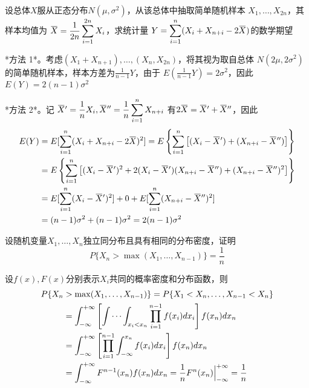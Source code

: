 \documentclass{article}
\begin{document}
\begin{examplle}[]
设总体\(X\)服从正态分布\(N(\mu,\sigma^2)\)，从该总体中抽取简单随机样本
\(X_1,\dots,X_{2n}\)，其样本均值为
\(\displaystyle\bbar{X}=\frac{1}{2n}\sum_{i=1}^{2n}X_i\)，求统计量
\(Y=\displaystyle\sum_{i=1}^n(X_i+X_{n+i}-2\bbar{X})\)的数学期望

*方法 1*。考虑\((X_1+X_{n+1}),\dots,(X_n,X_{2n})\)，将其视为取自总体
\(N(2\mu,2\sigma^2)\)的简单随机样本，样本方差为\(\frac{1}{n-1}Y\)，由于
\(E(\frac{1}{n-1}Y)=2\sigma^2\)，因此\(E(Y)=2(n-1)\sigma^2\)

*方法 2*。记
\(\bbar{X}'=\displaystyle\frac{1}{n}X_i,\bbar{X}''=\frac{1}{n}\sum_{i=1}^nX_{n+i}\)
有\(2\bbar{X} =\bbar{X}'+\bbar{X}''\)，因此
\begin{align*}
E(Y)&=E[\sum_{i=1}^n(X_i+X_{n+i}-2\bbar{X})^2]=
E\left\{\sum_{i=1}^n\left[(X_i-\bbar{X}')+(X_{n+i}-\bbar{X}'')\right]\right\}\\
&=E\left\{\sum_{i=1}^n\left[(X_i-\bbar{X}')^2+2(X_i-\bbar{X}')(X_{n+i}-\bbar{X}'')+
(X_{n+i}-\bbar{X}'')^2\right]\right\}\\
&=E[\sum_{i=1}^n(X_i-\bbar{X}')^2]+0+E[\sum_{i=1}^n(X_{n+i}-\bbar{X}'')^2]\\
&=(n-1)\sigma^2+(n-1)\sigma^2=2(n-1)\sigma^2
\end{align*}
\end{examplle}

\begin{examplle}[]
设随机变量\(X_1,\dots,X_n\)独立同分布且具有相同的分布密度，证明
\begin{equation*}
P\{X_n>\max(X_1,\dots,X_{n-1})\}=\frac{1}{n}
\end{equation*}

设\(f(x),F(x)\)分别表示\(X_i\)共同的概率密度和分布函数，则
\begin{align*}
P\{X_n&>\max(X_1,\dots,X_{n-1})\}=P\{X_1<X_n,\dots,X_{n-1}<X_n\}\\
&=\int_{-\infty}^{+\infty}\left[\idotsint_{x_i<x_n}\prod_{i=1}^{n-1}f(x_i)dx_i\right]f(x_n)dx_n\\
&=\int_{-\infty}^{+\infty}\left[\prod_{i=1}^{n-1}\int_{-\infty}^{x_n}f(x_i)dx_i
\right]f(x_n)dx_n\\
&=\int_{-\infty}^{+\infty}F^{n-1}(x_n)f(x_n)dx_n=\frac{1}{n}F^n(x_n)
\Big\rvert_{-\infty}^{+\infty}=\frac{1}{n}
\end{align*}
\end{examplle}
\end{document}

